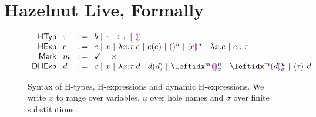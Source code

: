 
\clearpage
\newcommand{\calculusSec}{Hazelnut Live, Formally}
\section{\protect\calculusSec}
\label{sec:calculus}

\begin{figure}[!ht]
$\arraycolsep=4pt\begin{array}{rllllll}
\mathsf{HTyp} & \htau & ::= &
  b ~\vert~
  \tarr{\htau}{\htau} ~\vert~
  \tehole\\
\mathsf{HExp} & \hexp & ::= &
  c ~\vert~
  x ~\vert~
  \halam{x}{\htau}{\hexp} ~\vert~
  \hap{\hexp}{\hexp} ~\vert~
  \hehole{u} ~\vert~
  \hhole{\hexp}{u} ~\vert~
  {\hlam{x}{\hexp}} ~\vert~
  \hexp : \htau\\
\mathsf{Mark} & \markname{} & ::= &
  \evaled{} ~\vert~  \unevaled{}\\
 \mathsf{DHExp} & \dexp  & ::= &
  c ~\vert~
  x ~\vert~
  {\halam{x}{\htau}{\dexp}} ~\vert~
  \hap{\dexp}{\dexp} ~\vert~
  \dehole{\mvar}{\subst}{\markname} ~\vert~
  \dhole{\dexp}{\mvar}{\subst}{\markname} ~\vert~
  \dcast{\htau}{\dexp}\\
\end{array}$
\caption{Syntax of H-types, H-expressions and dynamic H-expressions. We write $x$ to range over variables, $u$ over hole names and $\sigma$ over finite substitutions.}
\label{fig:HTyp}
\label{fig:HExp}
\end{figure}

